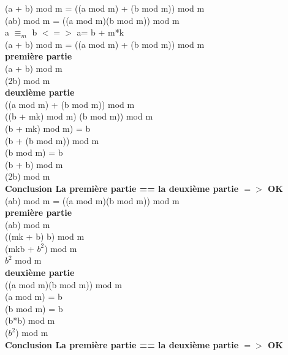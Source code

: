     (a + b) mod m = ((a mod m) + (b mod m)) mod m \\
    (ab) mod m = ((a mod m)(b mod m)) mod m \\

a $≡_{m}$ b $<=>$ a= b + m*k \\
(a + b) mod m = ((a mod m) + (b mod m)) mod m \\

\textbf{première partie} \\

(a + b) mod m \\
(2b) mod m \\

\textbf{deuxième partie} \\

((a mod m) + (b mod m)) mod m  \\
((b + mk) mod m) (b mod m)) mod m \\

(b + mk) mod m) = b \\
(b + (b mod m)) mod m \\

(b mod m) = b \\
(b + b) mod m \\
(2b) mod m \\

\textbf{Conclusion La première partie == la deuxième partie $=>$ OK} \\

(ab) mod m = ((a mod m)(b mod m)) mod m \\

\textbf{première partie} \\

(ab) mod m \\
((mk + b) b) mod m \\
(mkb + $b^{2}$) mod m \\
$b^{2}$ mod m \\

\textbf{deuxième partie} \\

((a mod m)(b mod m)) mod m \\

(a mod m) = b \\
(b mod m) = b \\

(b*b) mod m \\
($b^{2}$) mod m \\

\textbf{Conclusion La première partie == la deuxième partie $=>$ OK} \\


